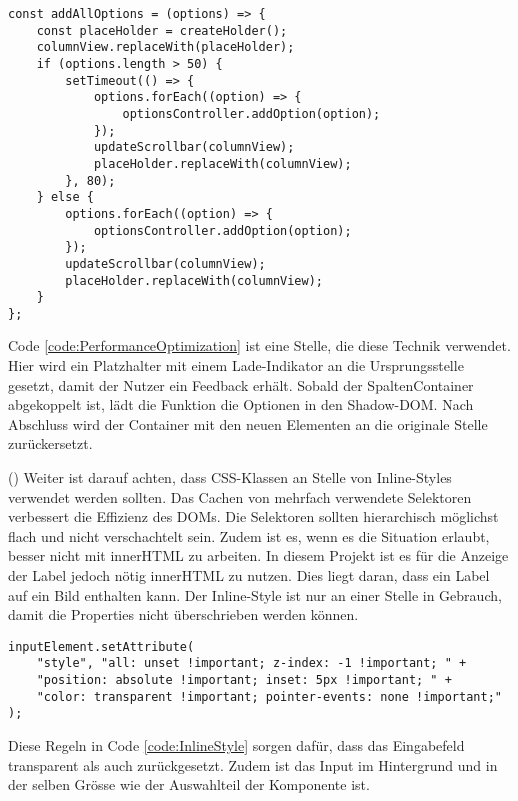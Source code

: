 \begin{lstlisting}[style = htmlcssjs, caption = Performance Optimierung (columnOptionsComponent.js), label = code:PerformanceOptimization]
const addAllOptions = (options) => {
    const placeHolder = createHolder();
    columnView.replaceWith(placeHolder);
    if (options.length > 50) {
        setTimeout(() => {
            options.forEach((option) => {
                optionsController.addOption(option);
            });
            updateScrollbar(columnView);
            placeHolder.replaceWith(columnView);
        }, 80);
    } else {
        options.forEach((option) => {
            optionsController.addOption(option);
        });
        updateScrollbar(columnView);
        placeHolder.replaceWith(columnView);
    }
};
\end{lstlisting}

Code \ref{code:PerformanceOptimization} ist eine Stelle, die diese Technik verwendet.
Hier wird ein Platzhalter mit einem Lade-Indikator an die Ursprungsstelle gesetzt, damit der Nutzer ein Feedback erhält.
Sobald der SpaltenContainer abgekoppelt ist, lädt die Funktion die Optionen in den Shadow-DOM.
Nach Abschluss wird der Container mit den neuen Elementen an die originale Stelle zurückersetzt.

(\cite{efficientDomManipulation}) Weiter ist darauf achten, dass CSS-Klassen an Stelle von Inline-Styles verwendet werden sollten.
Das Cachen von mehrfach verwendete Selektoren verbessert die Effizienz des DOMs.
Die Selektoren sollten hierarchisch möglichst flach und nicht verschachtelt sein.
Zudem ist es, wenn es die Situation erlaubt, besser nicht mit innerHTML zu arbeiten.
In diesem Projekt ist es für die Anzeige der Label jedoch nötig innerHTML zu nutzen.
Dies liegt daran, dass ein Label auf ein Bild enthalten kann.
Der Inline-Style ist nur an einer Stelle in Gebrauch, damit die Properties nicht überschrieben werden können.

\begin{lstlisting}[style = htmlcssjs, caption = Inline-Style für Inputfeld, label = code:InlineStyle]
inputElement.setAttribute(
    "style", "all: unset !important; z-index: -1 !important; " +
    "position: absolute !important; inset: 5px !important; " +
    "color: transparent !important; pointer-events: none !important;"
);
\end{lstlisting}

Diese Regeln in Code \ref{code:InlineStyle} sorgen dafür, dass das Eingabefeld transparent als auch zurückgesetzt.
Zudem ist das Input im Hintergrund und in der selben Grösse wie der Auswahlteil der Komponente ist.


